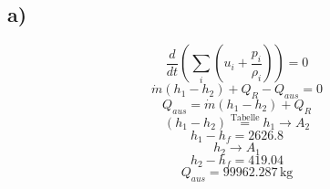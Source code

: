 

\subsection*{a)}
\[
\frac{d}{dt} \left( \sum_i (u_i + \frac{p_i}{\rho_i}) \right) = 0
\]
\[
\dot{m}(h_1 - h_2) + Q_R - Q_{aus} = 0
\]
\[
Q_{aus} = \dot{m}(h_1 - h_2) + Q_R
\]
\[
(h_1 - h_2) \stackrel{\text{Tabelle}}{=} h_1 \rightarrow A_2
\]
\[
h_1 - h_f = 2626.8
\]
\[
h_2 \rightarrow A_1
\]
\[
h_2 - h_f = 419.04
\]
\[
Q_{aus} = 99962.287 \, \text{kg}
\]